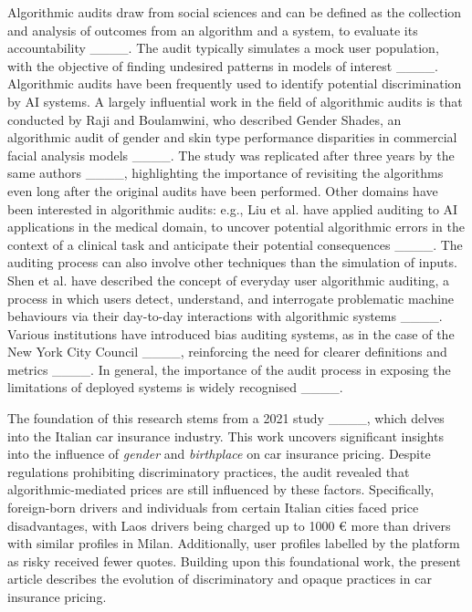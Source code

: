 Algorithmic audits draw from social sciences and can be defined as the collection and analysis of outcomes from an algorithm and a system, to evaluate its accountability ____. The audit typically simulates a mock user population, with the objective of finding undesired patterns in models of interest ____.
Algorithmic audits have been frequently used to identify potential discrimination by AI systems. A largely influential work in the field of algorithmic audits is that conducted by Raji and Boulamwini, who described Gender Shades, an algorithmic audit of gender and skin type performance disparities in commercial facial analysis models ____. The study was replicated after three years by the same authors ____, highlighting the importance of revisiting the algorithms even long after the original audits have been performed.
Other domains have been interested in algorithmic audits: e.g., Liu et al. have applied auditing to AI applications in the medical domain, to uncover potential algorithmic errors in the context of a clinical task and anticipate their potential consequences ____. 
The auditing process can also involve other techniques than the simulation of inputs. Shen et al. have described the concept of everyday user algorithmic auditing, a process in which users detect, understand, and interrogate problematic machine behaviours via their day-to-day interactions with algorithmic systems ____.
Various institutions have introduced bias auditing systems, as in the case of the New York City Council ____, reinforcing the need for clearer definitions and metrics ____. In general, the importance of the audit process in exposing the limitations of deployed systems is widely recognised ____.

The foundation of this research stems from a 2021 study ____, which delves into the Italian car insurance industry. This work uncovers significant insights into the influence of \textit{gender} and \textit{birthplace} on car insurance pricing. Despite regulations prohibiting discriminatory practices, the audit revealed that algorithmic-mediated prices are still influenced by these factors. 
Specifically, foreign-born drivers and individuals from certain Italian cities faced price disadvantages, with Laos drivers being charged up to 1000 € more than drivers with similar profiles in Milan. Additionally, user profiles labelled by the platform as risky received fewer quotes.
Building upon this foundational work, the present article describes the evolution of discriminatory and opaque practices in car insurance pricing.


